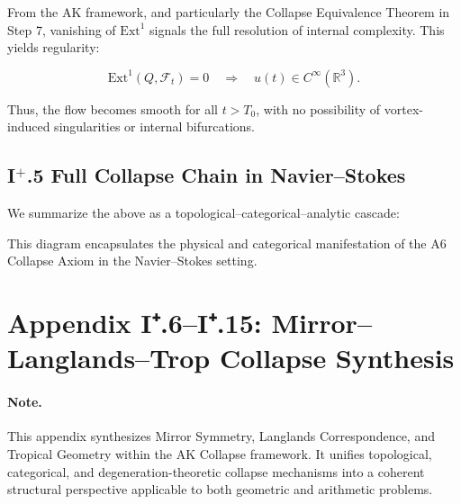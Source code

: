 \documentclass[11pt]{article}
\begin{document}
From the AK framework, and particularly the Collapse Equivalence Theorem in Step 7,  
vanishing of \( \mathrm{Ext}^1 \) signals the full resolution of internal complexity.  
This yields regularity:

\[
\mathrm{Ext}^1(Q, \mathcal{F}_t) = 0 \quad \Rightarrow \quad u(t) \in C^\infty(\mathbb{R}^3).
\]

Thus, the flow becomes smooth for all \( t > T_0 \), with no possibility  
of vortex-induced singularities or internal bifurcations.

\subsection*{I$^+$.5 Full Collapse Chain in Navier--Stokes}

We summarize the above as a topological–categorical–analytic cascade:

\begin{center}
\end{center}

This diagram encapsulates the physical and categorical manifestation  
of the A6 Collapse Axiom in the Navier--Stokes setting.




\section*{Appendix I⁺.6–I⁺.15: Mirror–Langlands–Trop Collapse Synthesis}

\paragraph{Note.}  
This appendix synthesizes Mirror Symmetry, Langlands Correspondence, and Tropical Geometry  
within the AK Collapse framework. It unifies topological, categorical, and degeneration-theoretic  
collapse mechanisms into a coherent structural perspective applicable to both geometric and arithmetic problems.
\end{document}
